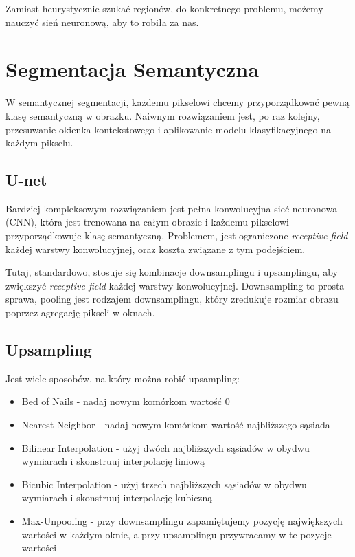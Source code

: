 \documentclass{../notatki}
\begin{document}
Zamiast heurystycznie szukać regionów, do konkretnego problemu, możemy
nauczyć sień neuronową, aby to robiła za nas.

\section{Segmentacja Semantyczna}

W semantycznej segmentacji, każdemu pikselowi chcemy przyporządkować pewną
klasę semantyczną w obrazku.
Naiwnym rozwiązaniem jest, po raz kolejny, przesuwanie okienka kontekstowego
i aplikowanie modelu klasyfikacyjnego na każdym pikselu.

\subsection{U-net}

Bardziej kompleksowym rozwiązaniem jest pełna konwolucyjna sieć neuronowa (CNN),
która jest trenowana na całym obrazie i każdemu pikselowi
przyporządkowuje klasę semantyczną. Problemem, jest ograniczone
\textit{receptive field} każdej warstwy konwolucyjnej, oraz koszta związane z
tym podejściem.

Tutaj, standardowo, stosuje się kombinacje downsamplingu i upsamplingu,
aby zwiększyć \textit{receptive field} każdej warstwy konwolucyjnej.
Downsampling to prosta sprawa, pooling jest rodzajem downsamplingu, który
zredukuje rozmiar obrazu poprzez agregację pikseli w oknach.

\subsection{Upsampling}

Jest wiele sposobów, na który można robić upsampling:
\begin{itemize}
  \item Bed of Nails - nadaj nowym komórkom wartość $0$
  \item Nearest Neighbor - nadaj nowym komórkom wartość najbliższego sąsiada
  \item Bilinear Interpolation - użyj dwóch najbliższych sąsiadów w
    obydwu wymiarach i skonstruuj interpolację liniową
  \item Bicubic Interpolation - użyj trzech najbliższych sąsiadów w
    obydwu wymiarach i skonstruuj interpolację kubiczną
  \item Max-Unpooling - przy downsamplingu zapamiętujemy pozycję największych
    wartości w każdym oknie, a przy upsamplingu przywracamy w te pozycje
    wartości
\end{itemize}
\end{document}

